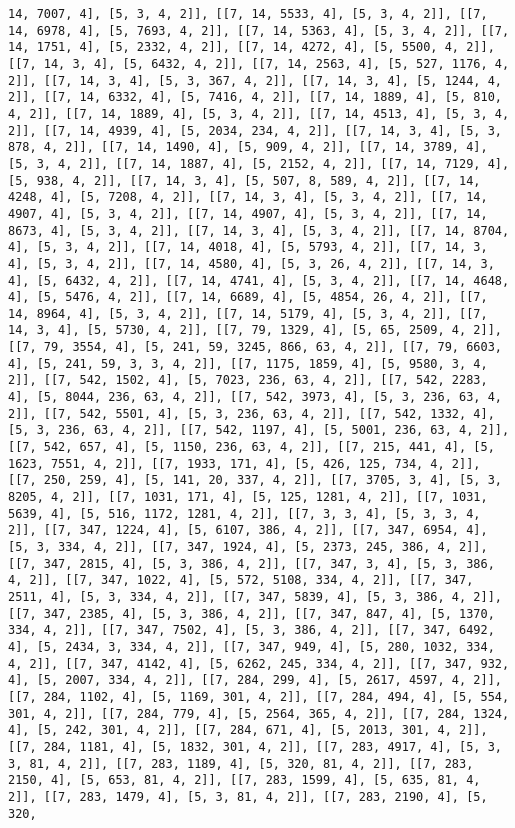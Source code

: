 \documentclass[12pt,fleqn]{article}\usepackage{../../common}
\begin{document}
\begin{verbatim}
14, 7007, 4], [5, 3, 4, 2]], [[7, 14, 5533, 4], [5, 3, 4, 2]], [[7, 14, 6978, 4], [5, 7693, 4, 2]], [[7, 14, 5363, 4], [5, 3, 4, 2]], [[7, 14, 1751, 4], [5, 2332, 4, 2]], [[7, 14, 4272, 4], [5, 5500, 4, 2]], [[7, 14, 3, 4], [5, 6432, 4, 2]], [[7, 14, 2563, 4], [5, 527, 1176, 4, 2]], [[7, 14, 3, 4], [5, 3, 367, 4, 2]], [[7, 14, 3, 4], [5, 1244, 4, 2]], [[7, 14, 6332, 4], [5, 7416, 4, 2]], [[7, 14, 1889, 4], [5, 810, 4, 2]], [[7, 14, 1889, 4], [5, 3, 4, 2]], [[7, 14, 4513, 4], [5, 3, 4, 2]], [[7, 14, 4939, 4], [5, 2034, 234, 4, 2]], [[7, 14, 3, 4], [5, 3, 878, 4, 2]], [[7, 14, 1490, 4], [5, 909, 4, 2]], [[7, 14, 3789, 4], [5, 3, 4, 2]], [[7, 14, 1887, 4], [5, 2152, 4, 2]], [[7, 14, 7129, 4], [5, 938, 4, 2]], [[7, 14, 3, 4], [5, 507, 8, 589, 4, 2]], [[7, 14, 4248, 4], [5, 7208, 4, 2]], [[7, 14, 3, 4], [5, 3, 4, 2]], [[7, 14, 4907, 4], [5, 3, 4, 2]], [[7, 14, 4907, 4], [5, 3, 4, 2]], [[7, 14, 8673, 4], [5, 3, 4, 2]], [[7, 14, 3, 4], [5, 3, 4, 2]], [[7, 14, 8704, 4], [5, 3, 4, 2]], [[7, 14, 4018, 4], [5, 5793, 4, 2]], [[7, 14, 3, 4], [5, 3, 4, 2]], [[7, 14, 4580, 4], [5, 3, 26, 4, 2]], [[7, 14, 3, 4], [5, 6432, 4, 2]], [[7, 14, 4741, 4], [5, 3, 4, 2]], [[7, 14, 4648, 4], [5, 5476, 4, 2]], [[7, 14, 6689, 4], [5, 4854, 26, 4, 2]], [[7, 14, 8964, 4], [5, 3, 4, 2]], [[7, 14, 5179, 4], [5, 3, 4, 2]], [[7, 14, 3, 4], [5, 5730, 4, 2]], [[7, 79, 1329, 4], [5, 65, 2509, 4, 2]], [[7, 79, 3554, 4], [5, 241, 59, 3245, 866, 63, 4, 2]], [[7, 79, 6603, 4], [5, 241, 59, 3, 3, 4, 2]], [[7, 1175, 1859, 4], [5, 9580, 3, 4, 2]], [[7, 542, 1502, 4], [5, 7023, 236, 63, 4, 2]], [[7, 542, 2283, 4], [5, 8044, 236, 63, 4, 2]], [[7, 542, 3973, 4], [5, 3, 236, 63, 4, 2]], [[7, 542, 5501, 4], [5, 3, 236, 63, 4, 2]], [[7, 542, 1332, 4], [5, 3, 236, 63, 4, 2]], [[7, 542, 1197, 4], [5, 5001, 236, 63, 4, 2]], [[7, 542, 657, 4], [5, 1150, 236, 63, 4, 2]], [[7, 215, 441, 4], [5, 1623, 7551, 4, 2]], [[7, 1933, 171, 4], [5, 426, 125, 734, 4, 2]], [[7, 250, 259, 4], [5, 141, 20, 337, 4, 2]], [[7, 3705, 3, 4], [5, 3, 8205, 4, 2]], [[7, 1031, 171, 4], [5, 125, 1281, 4, 2]], [[7, 1031, 5639, 4], [5, 516, 1172, 1281, 4, 2]], [[7, 3, 3, 4], [5, 3, 3, 4, 2]], [[7, 347, 1224, 4], [5, 6107, 386, 4, 2]], [[7, 347, 6954, 4], [5, 3, 334, 4, 2]], [[7, 347, 1924, 4], [5, 2373, 245, 386, 4, 2]], [[7, 347, 2815, 4], [5, 3, 386, 4, 2]], [[7, 347, 3, 4], [5, 3, 386, 4, 2]], [[7, 347, 1022, 4], [5, 572, 5108, 334, 4, 2]], [[7, 347, 2511, 4], [5, 3, 334, 4, 2]], [[7, 347, 5839, 4], [5, 3, 386, 4, 2]], [[7, 347, 2385, 4], [5, 3, 386, 4, 2]], [[7, 347, 847, 4], [5, 1370, 334, 4, 2]], [[7, 347, 7502, 4], [5, 3, 386, 4, 2]], [[7, 347, 6492, 4], [5, 2434, 3, 334, 4, 2]], [[7, 347, 949, 4], [5, 280, 1032, 334, 4, 2]], [[7, 347, 4142, 4], [5, 6262, 245, 334, 4, 2]], [[7, 347, 932, 4], [5, 2007, 334, 4, 2]], [[7, 284, 299, 4], [5, 2617, 4597, 4, 2]], [[7, 284, 1102, 4], [5, 1169, 301, 4, 2]], [[7, 284, 494, 4], [5, 554, 301, 4, 2]], [[7, 284, 779, 4], [5, 2564, 365, 4, 2]], [[7, 284, 1324, 4], [5, 242, 301, 4, 2]], [[7, 284, 671, 4], [5, 2013, 301, 4, 2]], [[7, 284, 1181, 4], [5, 1832, 301, 4, 2]], [[7, 283, 4917, 4], [5, 3, 3, 81, 4, 2]], [[7, 283, 1189, 4], [5, 320, 81, 4, 2]], [[7, 283, 2150, 4], [5, 653, 81, 4, 2]], [[7, 283, 1599, 4], [5, 635, 81, 4, 2]], [[7, 283, 1479, 4], [5, 3, 81, 4, 2]], [[7, 283, 2190, 4], [5, 320, 
\end{verbatim}
\end{document}
